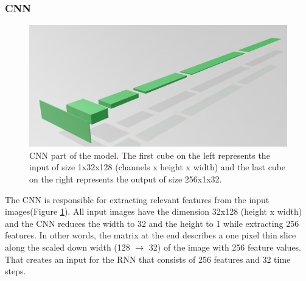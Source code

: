 \documentclass{article}
\begin{document}
\subsubsection{CNN}
\begin{figure}[H]
\begin{center}
\includegraphics[scale=0.3]{CNN}
\end{center}
\caption{CNN part of the model. The first cube on the left represents the input of size 1x32x128 (channels x height x width) and the last cube on the right represents the output of size 256x1x32.}
\label{fig:ModelCNN}
\end{figure}
The CNN is responsible for extracting relevant features from the input images(Figure \ref{fig:ModelCNN}). All input images have the dimension 32x128 (height x width) and the CNN reduces the width to 32 and the height to 1 while extracting 256 features. In other words, the matrix at the end describes a one pixel thin slice along the scaled down width (128 $\rightarrow$ 32) of the image with 256 feature values. That creates an input for the RNN that consists of 256 features and 32 time steps.
\end{document}
